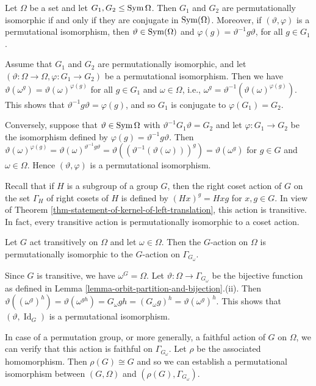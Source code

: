 



\begin{proposition} \label{prop-isom-perm-grp-are-conj}
	Let $\Omega$ be a set and let $G_1, G_2 \le \operatorname{Sym}\Omega$. Then $G_1$ and $G_2$ are permutationally isomorphic if and only if they are conjugate in $\operatorname{Sym}(\Omega)$. Moreover, if $(\vartheta, \varphi)$ is a permutational isomorphism, then $\vartheta \in \operatorname{Sym}(\Omega)$ and $\varphi(g) = \vartheta^{-1}g\vartheta$, for all $g \in G_1$.
\end{proposition}

\begin{sketch}
	Assume that $G_1$ and $G_2$ are permutationally isomorphic, and let $(\vartheta:\Omega\to \Omega, \varphi:G_1\rightarrow G_2)$ be a permutational isomorphism. Then we have $\vartheta(\omega^g) = \vartheta(\omega)^{\varphi(g)}$ for all $g \in G_1$ and $\omega \in \Omega$, i.e., $\omega^g = \vartheta^{-1}(\vartheta(\omega)^{\varphi(g)})$. This shows that $\vartheta^{-1}g\vartheta = \varphi(g)$, and so $G_1$ is conjugate to $\varphi(G_1) = G_2$.
	
	Conversely, suppose that $\vartheta \in \operatorname{Sym}\Omega$ with $\vartheta^{-1}G_1\vartheta = G_2$ and let $\varphi: G_1 \to G_2$ be the isomorphism defined by  $\varphi(g) = \vartheta^{-1}g\vartheta$. Then  $\vartheta(\omega)^{\varphi(g)} = \vartheta(\omega)^{\vartheta^{-1}g\vartheta} = \vartheta((\vartheta^{-1}(\vartheta(\omega)))^{g}) = \vartheta(\omega^g)$ for $g \in G$ and $\omega \in \Omega$. Hence $(\vartheta, \varphi)$ is a permutational isomorphism.
\end{sketch}

 Recall that if $H$ is a subgroup of  a group $G$, then the right coset action of $G$ on the set $\Gamma_H$ of right cosets of $H$  is defined by $(Hx)^g  = Hxg$ for $x,g\in G$. In view of Theorem \ref{thm-statement-of-kernel-of-left-translation}, this action is transitive. In fact, every transitive action is permutationally isomorphic to a coset action. 
\begin{proposition} \label{prop-transitive-action-perm-isom}
	Let $G$ act transitively on $\Omega$ and let $\omega\in \Omega$. Then the $G$-action on $\Omega$ is permutationally isomorphic to the $G$-action on $\Gamma_{G_\omega}$.
\end{proposition}
\begin{sketch}
	Since $G$ is transitive, we have $\omega^G = \Omega$. Let $\vartheta:\Omega \rightarrow \Gamma_{G_\omega}$ be the bijective function as defined in Lemma \ref{lemma-orbit-partition-and-bijection}.(ii). Then $\vartheta((\omega^g)^h) = \vartheta(\omega^{gh}) = G_\omega gh = (G_\omega g)^h = \vartheta(\omega^g)^h$. This shows that $(\vartheta,\operatorname{Id}_G)$ is a permutational isomorphism.
\end{sketch}
\begin{remark}
	In case of a permutation group, or more generally, a faithful action of $G$ on $\Omega$, we can verify that this action is faithful on $\Gamma_{G_\omega}$. Let $\rho$ be the associated homomorphism. Then $\rho(G)\cong G$ and so we can establish a permutational isomorphism between $(G,\Omega)$ and $(\rho(G),\Gamma_{G_\omega})$.
\end{remark}


